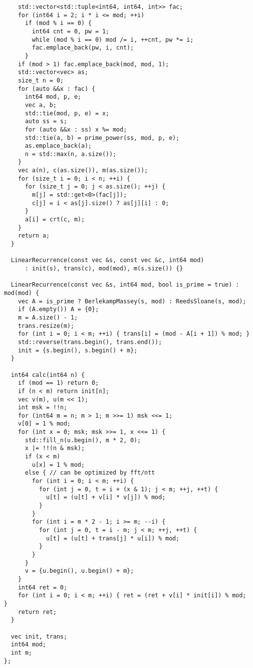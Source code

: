 \documentclass[twoside]{article}
\begin{document}
\begin{lstlisting}
    std::vector<std::tuple<int64, int64, int>> fac;
    for (int64 i = 2; i * i <= mod; ++i)
      if (mod % i == 0) {
        int64 cnt = 0, pw = 1;
        while (mod % i == 0) mod /= i, ++cnt, pw *= i;
        fac.emplace_back(pw, i, cnt);
      }
    if (mod > 1) fac.emplace_back(mod, mod, 1);
    std::vector<vec> as;
    size_t n = 0;
    for (auto &&x : fac) {
      int64 mod, p, e;
      vec a, b;
      std::tie(mod, p, e) = x;
      auto ss = s;
      for (auto &&x : ss) x %= mod;
      std::tie(a, b) = prime_power(ss, mod, p, e);
      as.emplace_back(a);
      n = std::max(n, a.size());
    }
    vec a(n), c(as.size()), m(as.size());
    for (size_t i = 0; i < n; ++i) {
      for (size_t j = 0; j < as.size(); ++j) {
        m[j] = std::get<0>(fac[j]);
        c[j] = i < as[j].size() ? as[j][i] : 0;
      }
      a[i] = crt(c, m);
    }
    return a;
  }

  LinearRecurrence(const vec &s, const vec &c, int64 mod)
      : init(s), trans(c), mod(mod), m(s.size()) {}

  LinearRecurrence(const vec &s, int64 mod, bool is_prime = true) : mod(mod) {
    vec A = is_prime ? BerlekampMassey(s, mod) : ReedsSloane(s, mod);
    if (A.empty()) A = {0};
    m = A.size() - 1;
    trans.resize(m);
    for (int i = 0; i < m; ++i) { trans[i] = (mod - A[i + 1]) % mod; }
    std::reverse(trans.begin(), trans.end());
    init = {s.begin(), s.begin() + m};
  }

  int64 calc(int64 n) {
    if (mod == 1) return 0;
    if (n < m) return init[n];
    vec v(m), u(m << 1);
    int msk = !!n;
    for (int64 m = n; m > 1; m >>= 1) msk <<= 1;
    v[0] = 1 % mod;
    for (int x = 0; msk; msk >>= 1, x <<= 1) {
      std::fill_n(u.begin(), m * 2, 0);
      x |= !!(n & msk);
      if (x < m)
        u[x] = 1 % mod;
      else { // can be optimized by fft/ntt
        for (int i = 0; i < m; ++i) {
          for (int j = 0, t = i + (x & 1); j < m; ++j, ++t) {
            u[t] = (u[t] + v[i] * v[j]) % mod;
          }
        }
        for (int i = m * 2 - 1; i >= m; --i) {
          for (int j = 0, t = i - m; j < m; ++j, ++t) {
            u[t] = (u[t] + trans[j] * u[i]) % mod;
          }
        }
      }
      v = {u.begin(), u.begin() + m};
    }
    int64 ret = 0;
    for (int i = 0; i < m; ++i) { ret = (ret + v[i] * init[i]) % mod; }
    return ret;
  }

  vec init, trans;
  int64 mod;
  int m;
};

\end{lstlisting}
\end{document}
